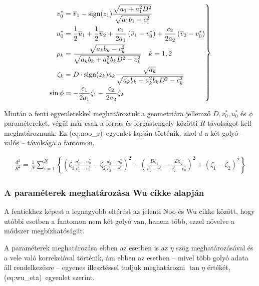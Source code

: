 \documentclass[a4paper,12pt]{article}
\begin{document}
\begin{equation}
\label{eq:noo_tobbi}
\left.
\begin{split}
v_0^* &= \overline{v}_1 - \text{sign} (z_1) \frac {\sqrt{a_1 + a_1^2D^2    }}{\sqrt{a_1b_1-c_1^2}}\\
u_0^* &= \frac{1}{2} \overline{u}_1  + \frac{1}{2} \overline{u}_2 + \frac{c_1}{2a_1} \left ( \overline{v}_1 - v_0^* \right) + \frac{c_2}{2a_2} \left (\overline{v}_2 - v_0^* \right)\\
\rho_k &= \frac{\sqrt{a_kb_k-c_k^2}}{\sqrt{a_kb_k+a_k^2b_kD^2-c_k^2}}  \hskip10pt k = 1,2\\
\zeta_k &= D \cdot \text{sign}(z_k)a_k \frac{\sqrt{a_k}}{\sqrt{a_kb_k+a_k^2b_kD^2-c_k^2}}\\
\sin \phi & = -\frac{c_1}{2a_1}  \zeta_1 - \frac{c_2}{2a_2} \zeta_2
\end{split}
\right \}
\end{equation}


Miután a fenti egyenletekkel meghatároztuk a geometriára jellemző $D, v_0^*, u_0^*$ és $\phi$ paramétereket, végül már csak a forrás és forgástengely közötti $R$ távolságot kell meghatároznunk. Ez \aref({eq:noo_r})~egyenlet lapján történik, ahol $d$ a két golyó -- valós -- távolsága a fantomon.

\begin{equation}
\label{eq:noo_r}
\begin{split}
\frac{d^2}{R^2} = \frac{1}{N} \sum_{i=1}^{N} \left\{ \left ( \zeta_1 \frac{u_1^i - u_0^*}{v_1^i - v_0^*}  - \zeta_2 \frac{u_2^i - u_0^*}{v_2^i - v_0^*} \right)^2 + \left( \frac{D \zeta_1}{v_1^i - v_0^*} - \frac{D \zeta_2}{v_2^i - v_0^*} \right)^2 + \left ( \zeta_1 - \zeta_2 \right) ^2 \right\}
\end{split}
\end{equation}


\subsubsection{A paraméterek meghatározása Wu\cite{wu} cikke alapján}
\label{sec:wu}


A fentiekhez képest a legnagyobb eltérést az jelenti Noo és Wu cikke között, hogy utóbbi esetben a fantomon nem két golyó van, hanem több, ezzel növelve a módszer megbízhatóságát. 

A paraméterek meghatározása ebben az esetben is az $\eta$ szög meghatározásával és a vele való korrekcióval történik, ám ebben az esetben -- mivel több golyó adata áll rendelkezésre -- egyenes illesztéssel tudjuk meghatározni $\tan \eta$ értékét, \aref({eq:wu_eta})~egyenlet szerint.
\end{document}

